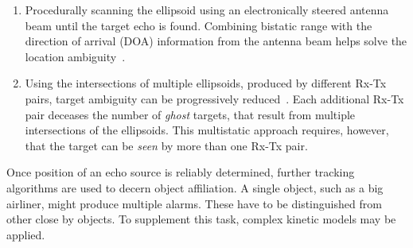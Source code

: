 \begin{enumerate}
    \item Procedurally scanning the ellipsoid using an electronically steered antenna beam until the target echo is found. Combining bistatic range with the direction of arrival (DOA) information from the antenna beam helps solve the location ambiguity~\cite[p.~132]{Griffiths2017}.
    \item Using the intersections of multiple ellipsoids, produced by different Rx-Tx pairs, target ambiguity can be progressively reduced~\cite[pp.~133-134]{Griffiths2017}. Each additional Rx-Tx pair deceases the number of \emph{ghost} targets, that result from multiple intersections of the ellipsoids. This multistatic approach requires, however, that the target can be \emph{seen} by more than one Rx-Tx pair.
\end{enumerate}

Once position of an echo source is reliably determined, further tracking algorithms are used to decern object affiliation. A single object, such as a big airliner, might produce multiple alarms. These have to be distinguished from other close by objects. To supplement this task, complex kinetic models may be applied.
